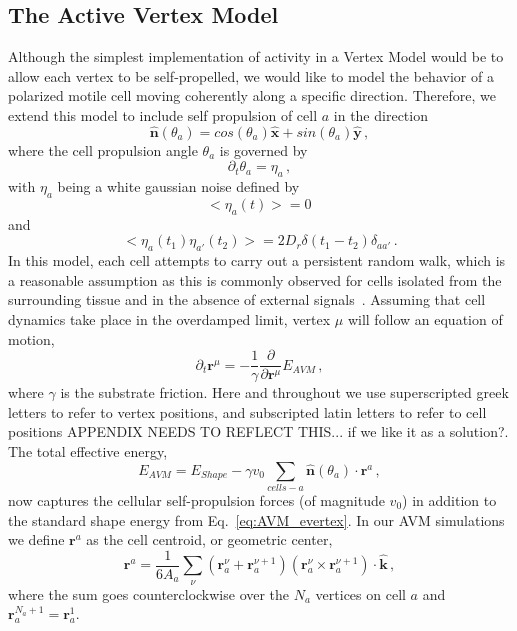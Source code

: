 \documentclass[
reprint
,aps
,amssymb
,amsmath
,superscriptaddress
]{revtex4-1}
\newcommand{\dms}[1]{{\color{magenta}#1}}
\begin{document}
\subsection{The Active Vertex Model}
Although the simplest implementation of activity in a Vertex Model would be to allow each vertex to be self-propelled, we would like to model the behavior of a polarized motile cell moving coherently along a specific direction. Therefore, we extend this model to include self propulsion of cell $a$ in the direction
%
\begin{equation}\label{eq:AVM_nhat}
\mathbf{\hat{n}}(\theta_a) = cos(\theta_a)\mathbf{\hat{x}} + sin(\theta_a)\mathbf{\hat{y}} \, ,
\end{equation}
%
where the cell propulsion angle $\theta_a$ is governed by
%
\begin{equation}\label{eq:AVM_theta_dynamics}
\partial_t \theta_a = \eta_a \, ,
\end{equation}
% 
with $\eta_a$ being a white gaussian noise defined by 
%
\begin{equation}\label{eq:AVM_noise_average}
<\eta_a(t)> = 0\, 
\end{equation}
% 
and
%
\begin{equation}\label{eq:AVM_noise_variance}
<\eta_a(t_1)\eta_{a'}(t_2)> = 2 D_r \delta(t_1 - t_2) \delta_{aa'} \, .
\end{equation}
% 
In this model, each cell attempts to carry out a persistent random walk, which is a reasonable assumption as this is commonly observed for cells isolated from the surrounding tissue and in the absence of external signals~\cite{Metzner2015, Passucci2019}.  Assuming that cell dynamics take place in the overdamped limit, vertex $\mu$ will follow an equation of motion,
%
\begin{equation}\label{eq:AVM_vert_dynamics}
\partial_t \mathbf{r}^\mu = -\frac{1}{\gamma} \frac{\partial}{\partial\mathbf{r}^\mu} E_{AVM} \, ,
\end{equation}
%
where $\gamma$ is the substrate friction. \dms{Here and throughout we use superscripted greek letters to refer to vertex positions, and subscripted latin letters to refer to cell positions APPENDIX NEEDS TO REFLECT THIS... if we like it as a solution?}. The total effective energy,
%
\begin{equation}\label{eq:AVM_total_energy}
E_{AVM} = E_{Shape}  - \gamma v_0 \sum_{cells-a}  \mathbf{\hat{n}}(\theta_a) \cdot \mathbf{r}^a \, ,
\end{equation}
%
now captures the cellular self-propulsion forces (of magnitude $v_0$) in addition to the standard shape energy from Eq.~\ref{eq:AVM_evertex}. In our AVM simulations we define $\mathbf{r}^a$ as the cell centroid, or geometric center, 
%
\begin{equation}\label{eq:centroid}
\mathbf{r}^a = \frac{1}{6 A_a}  \sum_{\nu} \left( \mathbf{r}_a^\nu  + \mathbf{r}_a^{\nu+1} \right) (\mathbf{r}_a^\nu  \times \mathbf{r}_a^{\nu+1}) \cdot \mathbf{\hat{k}} \, ,
\end{equation}
%
where the sum goes counterclockwise over the $N_a$ vertices on cell $a$ and $\mathbf{r}_a^{N_a + 1} = \mathbf{r}_a^1$.
\end{document}
